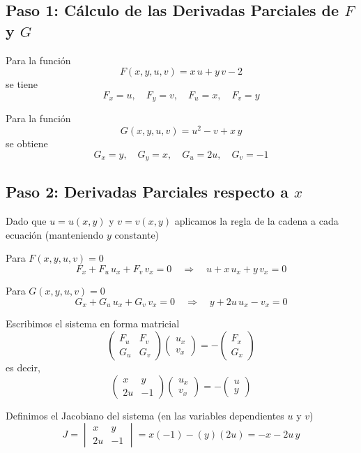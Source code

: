 \documentclass{article}
\begin{document}
\subsection*{Paso 1: Cálculo de las Derivadas Parciales de \(F\) y \(G\)}

Para la función
\[
F(x,y,u,v)= x\,u + y\,v - 2
\]
se tiene
\[
F_x = u,\quad F_y = v,\quad F_u = x,\quad F_v = y
\]

Para la función
\[
G(x,y,u,v)= u^2 - v + x\,y
\]
se obtiene
\[
G_x = y,\quad G_y = x,\quad G_u = 2u,\quad G_v = -1
\]

\subsection*{Paso 2: Derivadas Parciales respecto a \(x\)}

Dado que \(u = u(x,y)\) y \(v = v(x,y)\) aplicamos la regla de la cadena a cada ecuación (manteniendo \(y\) constante)

Para \(F(x,y,u,v)=0\)
\[
F_x + F_u\,u_x + F_v\,v_x = 0 \quad \Longrightarrow \quad u + x\,u_x + y\,v_x = 0
\]

Para \(G(x,y,u,v)=0\)
\[
G_x + G_u\,u_x + G_v\,v_x = 0 \quad \Longrightarrow \quad y + 2u\,u_x - v_x = 0
\]

Escribimos el sistema en forma matricial
\[
\begin{pmatrix}
F_u & F_v \\
G_u & G_v
\end{pmatrix}
\begin{pmatrix}
u_x \\[3mm] v_x
\end{pmatrix}
=
-\begin{pmatrix}
F_x \\[3mm] G_x
\end{pmatrix}
\]
es decir,
\[
\begin{pmatrix}
x & y \\
2u & -1
\end{pmatrix}
\begin{pmatrix}
u_x \\[3mm] v_x
\end{pmatrix}
=
-\begin{pmatrix}
u \\[3mm] y
\end{pmatrix}
\]

Definimos el Jacobiano del sistema (en las variables dependientes \(u\) y \(v\))
\[
J = \begin{vmatrix} x & y \\[2mm] 2u & -1 \end{vmatrix} = x(-1) - (y)(2u) = -x - 2u\,y
\]
\end{document}
